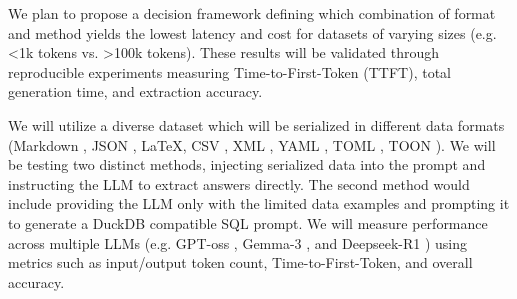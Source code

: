 \documentclass[a4paper, 12pt]{article}
\begin{document}
\ContributionsParagraph 
We plan to propose a decision framework defining which combination of format and method yields the lowest latency and cost for datasets of varying sizes (e.g. <1k tokens vs. >100k tokens). These results will be validated through reproducible experiments measuring Time-to-First-Token (TTFT), total generation time, and extraction accuracy.


\MethodologyParagraph
We will utilize a diverse dataset which will be serialized in different data formats (Markdown , JSON , \LaTeX , CSV , XML , YAML , TOML , TOON ). We will be testing two distinct methods, injecting serialized data into the prompt and instructing the LLM to extract answers directly. The second method would include providing the LLM only with the limited data examples and prompting it to generate a DuckDB compatible SQL prompt. We will measure performance across multiple LLMs (e.g. GPT-oss \cite{agarwal2025gpt}, Gemma-3 \cite{team2025gemma}, and Deepseek-R1 \cite{guo2025deepseek}) using metrics such as input/output token count, Time-to-First-Token, and overall accuracy.

 

 
\end{document}
